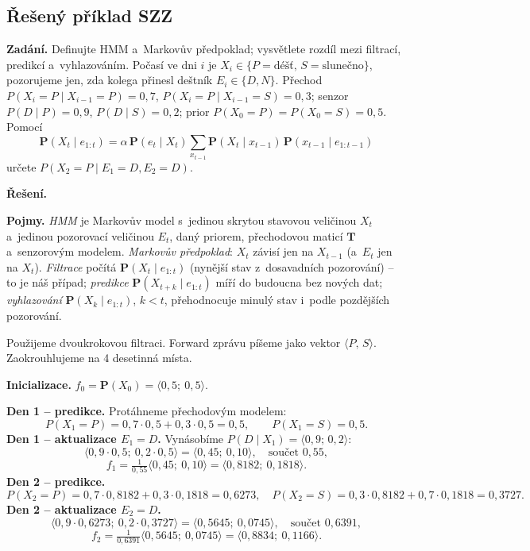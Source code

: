 \subsection{Řešený příklad SZZ}

\begin{priklad}
\par
\textbf{Zadání.} Definujte HMM a~Markovův předpoklad; vysvětlete rozdíl mezi filtrací, predikcí a~vyhlazováním. Počasí ve dni $i$ je $X_i\in\{P=\text{déšť},\,S=\text{slunečno}\}$, pozorujeme jen, zda kolega přinesl deštník $E_i\in\{D,N\}$. Přechod $P(X_i{=}P\mid X_{i-1}{=}P)=0{,}7$, $P(X_i{=}P\mid X_{i-1}{=}S)=0{,}3$; senzor $P(D\mid P)=0{,}9$, $P(D\mid S)=0{,}2$; prior $P(X_0{=}P)=P(X_0{=}S)=0{,}5$. Pomocí
\[
  \mathbf{P}(X_t\mid e_{1:t}) = \alpha\,\mathbf{P}(e_t\mid X_t)\sum_{x_{t-1}}\mathbf{P}(X_t\mid x_{t-1})\,\mathbf{P}(x_{t-1}\mid e_{1:t-1})
\]
určete $P(X_2{=}P\mid E_1{=}D,E_2{=}D)$.

\medskip
\textbf{Řešení.}

\textbf{Pojmy.} \emph{HMM} je Markovův model s~jedinou skrytou stavovou veličinou $X_t$ a~jedinou pozorovací veličinou $E_t$, daný priorem, přechodovou maticí $\mathbf{T}$ a~senzorovým modelem. \emph{Markovův předpoklad}: $X_t$ závisí jen na $X_{t-1}$ (a~$E_t$ jen na $X_t$). \emph{Filtrace} počítá $\mathbf{P}(X_t\mid e_{1:t})$ (nynější stav z~dosavadních pozorování) -- to je náš případ; \emph{predikce} $\mathbf{P}(X_{t+k}\mid e_{1:t})$ míří do budoucna bez nových dat; \emph{vyhlazování} $\mathbf{P}(X_k\mid e_{1:t})$, $k<t$, přehodnocuje minulý stav i~podle pozdějších pozorování.

Použijeme dvoukrokovou filtraci. Forward zprávu píšeme jako vektor $\langle P,\,S\rangle$. Zaokrouhlujeme na 4 desetinná místa.

\smallskip
\textbf{Inicializace.} $f_0 = \mathbf{P}(X_0) = \langle 0{,}5;\ 0{,}5\rangle$.

\textbf{Den 1 -- predikce.} Protáhneme přechodovým modelem:
\[
  P(X_1{=}P) = 0{,}7\cdot 0{,}5 + 0{,}3\cdot 0{,}5 = 0{,}5,\qquad P(X_1{=}S)=0{,}5.
\]
\textbf{Den 1 -- aktualizace $E_1{=}D$.} Vynásobíme $P(D\mid X_1)=\langle 0{,}9;\,0{,}2\rangle$:
\[
  \langle 0{,}9\cdot 0{,}5;\ 0{,}2\cdot 0{,}5\rangle = \langle 0{,}45;\ 0{,}10\rangle,\quad \text{součet } 0{,}55,
\]
\[
  f_1 = \tfrac{1}{0{,}55}\langle 0{,}45;\ 0{,}10\rangle = \langle 0{,}8182;\ 0{,}1818\rangle.
\]
\textbf{Den 2 -- predikce.}
\[
  P(X_2{=}P) = 0{,}7\cdot 0{,}8182 + 0{,}3\cdot 0{,}1818 = 0{,}6273,\quad
  P(X_2{=}S) = 0{,}3\cdot 0{,}8182 + 0{,}7\cdot 0{,}1818 = 0{,}3727.
\]
\textbf{Den 2 -- aktualizace $E_2{=}D$.}
\[
  \langle 0{,}9\cdot 0{,}6273;\ 0{,}2\cdot 0{,}3727\rangle = \langle 0{,}5645;\ 0{,}0745\rangle,\quad \text{součet } 0{,}6391,
\]
\[
  f_2 = \tfrac{1}{0{,}6391}\langle 0{,}5645;\ 0{,}0745\rangle = \langle 0{,}8834;\ 0{,}1166\rangle.
\]


\end{priklad}
